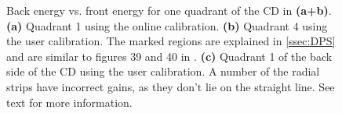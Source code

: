 \documentclass[twoside,english]{uiofysmaster/uiofysmaster}
\let\orgautoref\autoref
\renewcommand{\autoref}
        {%
		 \def\sectionautorefname{Section}%
		 \def\subsectionautorefname{Section}%
		 \def\subsubsectionautorefname{Section}%
		 \def\chapterautorefname{Chapter}%
          \orgautoref}
\begin{document}
\begin{figure}[htb]
\begin{subfigure}[t]{0.49\textwidth}
		\caption{}
		\label{fig:CD_cal_back}
	\end{subfigure}
	\caption{Back energy vs. front energy for one quadrant of the CD in \textbf{(a+b)}. 
	\textbf{(a)} Quadrant 1 using the online calibration.
	\textbf{(b)} Quadrant 4 using the user calibration. The marked regions are explained in \autoref{ssec:DPS} and are similar to figures 39 and 40 in \cite{Rosiak}.
	\textbf{(c)} Quadrant 1 of the back side of the CD using the user calibration. A number of the radial strips have incorrect gains, as they don't lie on the straight line.
	See text for more information.}
	\label{fig:FBE}
\end{figure}

\end{document}
